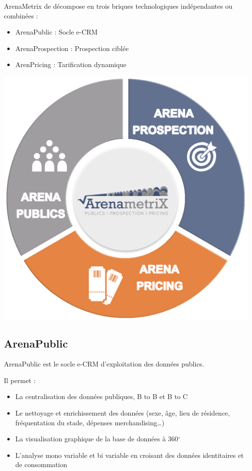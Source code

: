 ArenaMetrix de décompose en trois briques technologiques indépendantes ou combinées : 
\begin{itemize}
  \item[\textbullet] ArenaPublic : Socle e-CRM
  \item[\textbullet] ArenaProspection : Prospection ciblée
  \item[\textbullet] ArenPricing : Tarification dynamique
\end{itemize}

\begin{center}
\includegraphics[scale=0.45]{images/arenametrix.png}
\label{arenametrix}
\end{center}

\subsection{ArenaPublic}
ArenaPublic est le socle e-CRM d’exploitation des données publics.

Il permet :
\begin{itemize}
  \item[\textbullet] La centralisation des données publiques, B to B et B to C
  \item[\textbullet] Le nettoyage et enrichissement des données (sexe, âge, lieu de résidence, fréquentation du stade, dépenses merchandising…)
  \item[\textbullet] La visualisation graphique de la base de données à 360\ensuremath{^\circ}
  \item[\textbullet] L'analyse mono variable et bi variable en croisant des données identitaires et de consommation
\end{itemize}

